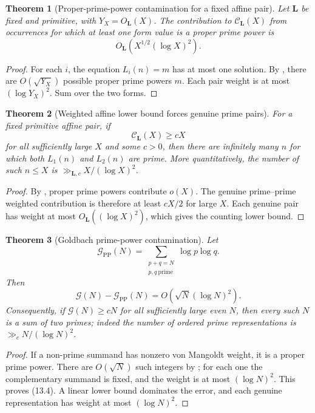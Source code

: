 \documentclass[11pt]{article}
\newtheorem{theorem}{Theorem}[section]
\theoremstyle{definition}
\theoremstyle{remark}
\newcommand{\PP}{\mathrm{PP}}
\begin{document}
\begin{theorem}[Proper-prime-power contamination for a fixed affine pair]
\label{thm:fixed-prime-power-noise}
Let $\bm L$ be fixed and primitive, with $Y_X=O_{\bm L}(X)$.  The contribution
to $\mathcal C_{\bm L}(X)$ from occurrences for which at least one form value
is a proper prime power is
\[
 \boxed{O_{\bm L}(X^{1/2}(\log X)^2).}
 \tag{13.1}
\]
\end{theorem}

\begin{proof}
For each $i$, the equation $L_i(n)=m$ has at most one solution.  By
, there are $O(\sqrt{Y_X})$ possible proper prime
powers $m$.  Each pair weight is at most $(\log Y_X)^2$.  Sum over the two
forms.
\end{proof}

\begin{theorem}[Weighted affine lower bound forces genuine prime pairs]
\label{thm:weighted-to-primes}
For a fixed primitive affine pair, if
\[
 \mathcal C_{\bm L}(X)\ge cX
 \tag{13.2}
\]
for all sufficiently large $X$ and some $c>0$, then there are infinitely many
$n$ for which both $L_1(n)$ and $L_2(n)$ are prime.  More quantitatively, the
number of such $n\le X$ is $\gg_{\bm L,c}X/(\log X)^2$.
\end{theorem}

\begin{proof}
By , proper prime powers contribute $o(X)$.
The genuine prime--prime weighted contribution is therefore at least $cX/2$
for large $X$.  Each genuine pair has weight at most $O_{\bm L}((\log X)^2)$,
which gives the counting lower bound.
\end{proof}

\begin{theorem}[Goldbach prime-power contamination]
\label{thm:Goldbach-prime-cleanup}
Let
\[
 \mathcal G_{\PP}(N)
 =\sum_{\substack{p+q=N\\p,q\ \mathrm{prime}}}\log p\log q.
 \tag{13.3}
\]
Then
\[
 \boxed{
 \mathcal G(N)-\mathcal G_{\PP}(N)
 =O(\sqrt N(\log N)^2).}
 \tag{13.4}
\]
Consequently, if $\mathcal G(N)\ge cN$ for all sufficiently large even $N$,
then every such $N$ is a sum of two primes; indeed the number of ordered prime
representations is $\gg_cN/(\log N)^2$.
\end{theorem}

\begin{proof}
If a non-prime summand has nonzero von Mangoldt weight, it is a proper prime
power.  There are $O(\sqrt N)$ such integers by
; for each one the complementary summand is fixed,
and the weight is at most $(\log N)^2$.  This proves \textup{(13.4)}.  A
linear lower bound dominates the error, and each genuine representation has
weight at most $(\log N)^2$.
\end{proof}
\end{document}
